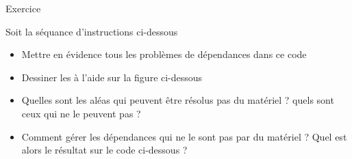 %
\begin{Frame}{Exercice}

\begin{block}{Soit la séquance d'instructions ci-dessous}
       \begin{center}
 	\begin{itemize}
         \item Mettre en évidence tous les problèmes de dépendances dans ce code
	\item Dessiner les à l'aide sur la figure ci-dessous
	\item Quelles sont les aléas qui peuvent être résolus pas du matériel ? quels sont ceux qui ne le peuvent pas ?
	\item Comment gérer les dépendances qui ne le sont pas par du matériel ? Quel est alors le résultat sur le code ci-dessous ?
        \end{itemize}
       \end{center}
      \end{block}   

\vspace{-0.8cm}
        \begin{center}
        \end{center}


\end{Frame}


